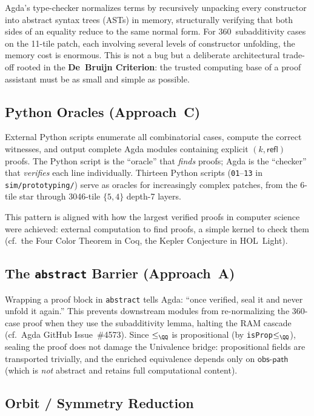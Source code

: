 \documentclass[11pt, a4paper]{article}
\theoremstyle{plain}
\theoremstyle{definition}
\newcommand{\refl}{\mathsf{refl}}
\begin{document}
Agda's type-checker normalizes terms by recursively unpacking every
constructor into abstract syntax trees (ASTs) in memory,
structurally verifying that both sides of an equality reduce to the
same normal form.  For 360~subadditivity cases on the 11-tile
patch, each involving several levels of constructor unfolding, the
memory cost is enormous.  This is not a bug but a deliberate
architectural trade-off rooted in the \textbf{De~Bruijn Criterion}:
the trusted computing base of a proof assistant must be as small
and simple as possible.

\subsection{Python Oracles (Approach~C)}

External Python scripts enumerate all combinatorial cases, compute
the correct witnesses, and output complete Agda modules containing
explicit $(k,\refl)$ proofs.  The Python script is the
``oracle'' that \emph{finds} proofs; Agda is the ``checker'' that
\emph{verifies} each line individually.  Thirteen Python scripts
(\texttt{01}--\texttt{13} in \texttt{sim/prototyping/}) serve as
oracles for increasingly complex patches, from the 6-tile star
through 3046-tile $\{5,4\}$ depth-7 layers.

This pattern is aligned with how the largest verified proofs in
computer science were achieved: external computation to find proofs,
a simple kernel to check them (cf.\ the Four Color Theorem in Coq,
the Kepler Conjecture in HOL~Light).

\subsection{The \texttt{abstract} Barrier (Approach~A)}

Wrapping a proof block in \texttt{abstract} tells Agda: ``once
verified, seal it and never unfold it again.''  This prevents
downstream modules from re-normalizing the 360-case proof when
they use the subadditivity lemma, halting the RAM cascade
(cf.\ Agda GitHub Issue~\#4573).  Since $\leq_\QQ$ is propositional
(by \texttt{isProp$\leq_\QQ$}), sealing the proof does not damage
the Univalence bridge: propositional fields are transported
trivially, and the enriched equivalence depends only on
$\mathsf{obs\text{-}path}$ (which is \emph{not} abstract and
retains full computational content).

\subsection{Orbit / Symmetry Reduction}
\label{sec:orbit}
\end{document}
